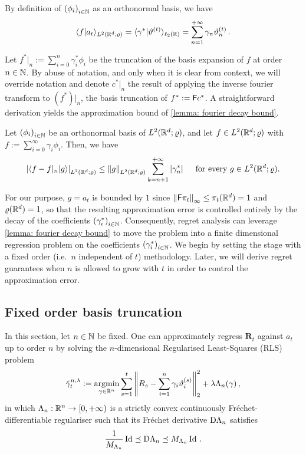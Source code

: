 By definition of ${(\phi_i)}_{i\in\mathbb{N}}$ as an orthonormal basis, we have 
\[
    \langle f\vert a_t\rangle_{L^2(\mathbb{R}^d;\varrho)}=\langle \gamma^*\vert \vartheta^{(t)}\rangle_{\ell_2(\mathbb{R})}=\sum_{n=1}^{+\infty} \gamma_n\vartheta^{(t)}_n\,.
\]

Let $f^*\vert_n:=\sum_{i=0}^n\gamma_i^*\phi_i$ be the truncation of the basis expansion of $f$ at order $n\in\mathbb{N}$. By abuse of notation, and only when it is clear from context, we will override notation and denote $c^*\vert_n$ the result of applying the inverse fourier transform to $(f^*)\vert_n$, the basis truncation of $f^*:=\mathsf{F} c^*$.
A straightforward derivation yields the approximation bound of \cref{lemma: fourier decay bound}.

\begin{lemma}\label{lemma: fourier decay bound}
    Let ${(\phi_i)}_{i\in\mathbb{N}}$ be an orthonormal basis of $L^2(\mathbb{R}^d;\varrho)$, and let $f\in L^2(\mathbb{R}^d;\varrho)$ with $f:=\sum_{i=0}^\infty \gamma_i\phi_i$. Then, we have
    \[
    \left\lvert \left\langle f - f\vert_n\vert g\right\rangle  \right\rvert_{L^2(\mathbb{R}^d;\varrho)}\le \left\lVert g\right\rVert_{L^2(\mathbb{R}^d;\varrho)}\sum_{k=n+1}^{+\infty}\left\lvert \gamma_n^* \right\rvert\quad \mbox{ for every } g\in L^2(\mathbb{R}^d;\varrho).
    \]
\end{lemma}

For our purpose, $g=a_t$ is bounded by $1$ since $\left\lVert\mathsf{F}\pi_t\right\rVert_\infty\le\pi_t(\mathbb{R}^d)=1$ and $\varrho(\mathbb{R}^d)=1$, so that the resulting approximation error is controlled entirely by the decay of the coefficients ${(\gamma_i^*)}_{i\in\mathbb{N}}$. Consequently, regret analysis can leverage \cref{lemma: fourier decay bound} to move the problem into a finite dimensional regression problem on the coefficients ${(\gamma_i^*)}_{i\in\mathbb{N}}$. We begin by setting the stage with a fixed order (i.e.\ $n$ independent of $t$) methodology. Later, we will derive regret guarantees when $n$ is allowed to grow with $t$ in order to control the approximation error. 


\subsection{Fixed order basis truncation}\label{subsubsec: finite order}

In this section, let $n\in\mathbb{N}$ be fixed. One can approximately regress $\bm{R}_t$ against $a_t$ up to order $n$ by solving the $n$-dimensional Regularised Least-Squares (RLS) problem
\begin{align}
    \hat \gamma^{n,\lambda}_t:=\operatorname*{argmin}_{\gamma\in\mathbb{R}^n} \sum_{s=1}^t \left\lVert R_s - \sum_{i=1}^n\gamma_i\vartheta^{(s)}_i\right\rVert_2^2 + \lambda \Lambda_n(\gamma)\,,\label{eq: RLS  basis truncation}
\end{align}
in which $\Lambda_n:\mathbb{R}^n\to[0,+\infty)$ is a strictly convex continuously Fréchet-differentiable regulariser such that its Fréchet derivative $\mathrm{D}\Lambda_n$ satisfies
\[
    \frac1{M_{\Lambda_n}}\operatorname{Id}\preceq \mathrm{D}\Lambda_n\preceq M_{\Lambda_n}\operatorname{Id}\,.
\] 

